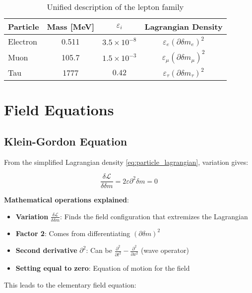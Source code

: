 \documentclass[12pt,a4paper]{article}
\newcommand{\deltam}{\delta m}
\newcommand{\Lag}{\mathcal{L}}
\theoremstyle{definition}
\theoremstyle{remark}
\begin{document}
	\begin{table}[htbp]
		\centering
		\begin{tabular}{lccc}
			\toprule
			\textbf{Particle} & \textbf{Mass [MeV]} & \textbf{$\varepsilon_i$} & \textbf{Lagrangian Density} \\
			\midrule
			Electron & 0.511 & $3.5 \times 10^{-8}$ & $\varepsilon_e (\partial \deltam_e)^2$ \\
			Muon & 105.7 & $1.5 \times 10^{-3}$ & $\varepsilon_{\mu} (\partial \deltam_{\mu})^2$ \\
			Tau & 1777 & $0.42$ & $\varepsilon_{\tau} (\partial \deltam_{\tau})^2$ \\
			\bottomrule
		\end{tabular}
		\caption{Unified description of the lepton family}
		\label{tab:lepton_parameters}
	\end{table}
	
	\section{Field Equations}
	
	\subsection{Klein-Gordon Equation}
	
	From the simplified Lagrangian density \eqref{eq:particle_lagrangian}, variation gives:
	
	\begin{equation}
		\frac{\delta \Lag}{\delta \deltam} = 2\varepsilon \partial^2 \deltam = 0
	\end{equation}
	
	\textbf{Mathematical operations explained}:
	\begin{itemize}
		\item \textbf{Variation} $\frac{\delta \Lag}{\delta \deltam}$: Finds the field configuration that extremizes the Lagrangian
		\item \textbf{Factor 2}: Comes from differentiating $(\partial \deltam)^2$
		\item \textbf{Second derivative} $\partial^2$: Can be $\frac{\partial^2}{\partial t^2} - \frac{\partial^2}{\partial x^2}$ (wave operator)
		\item \textbf{Setting equal to zero}: Equation of motion for the field
	\end{itemize}
	
	This leads to the elementary field equation:
	
\end{document}
